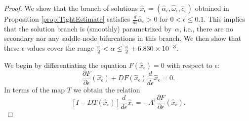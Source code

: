 %

\begin{proof}
We show that the branch of solutions  $ \hat{x}_\epsilon =  (\hat{\alpha}_\epsilon , \hat{\omega}_\epsilon , \hat{c}_\epsilon)$ obtained in Proposition \ref{prop:TightEstimate} satisfies $  \tfrac{d}{d \epsilon} \hat{\alpha}_\epsilon >0$ for $0<\epsilon \leq 0.1$.
This implies that the solution branch is (smoothly) parametrized by~$\alpha$,
i.e.,  there are no secondary nor any saddle-node bifurcations in this branch.
We then show that these $\epsilon$-values cover the range 
$\tfrac{\pi}{2}  < \alpha \leq \tfrac{\pi}{2} + 6.830  \times 10^{-3}$.
	
We begin by
	differentiating the equation $ F( \hat{x}_\epsilon) =0$ with respect to $ \epsilon$:
%
\begin{equation}
 \frac{\partial F}{\partial  \epsilon}(\hat{x}_\epsilon) + D F( \hat{x}_\epsilon)  \frac{d }{d  \epsilon} \hat{x}_\epsilon  = 0 .
\end{equation}
In terms of the map $T$ we obtain the relation
\[
\left[I-DT(\hat{x}_\epsilon)  \right]  \frac{d }{d \epsilon} \hat{x}_\epsilon   
=- A^{\dagger} \frac{\partial F}{\partial  \epsilon}(\hat{x}_\epsilon)  .
\]


\end{proof}

